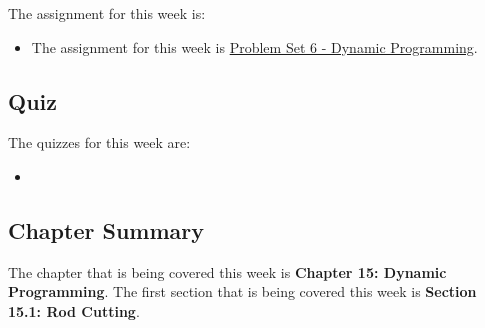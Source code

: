 The assignment for this week is:

\begin{itemize}
    \item The assignment for this week is \href{https://github.com/QuantumCompiler/CU/tree/main/CSPB%203104%20-%20Algorithms/CSPB%203104%20-%20Assignments/CSPB%203104%20-%20Problem%20Sets/CSPB%203104%20-%20Problem%20Set%206%20-%20Dynamic%20Programming}{Problem Set 6 - Dynamic Programming}. 
\end{itemize}

\subsection{Quiz}

The quizzes for this week are:

\begin{itemize}
    \item {} \textbullet {} 
\end{itemize}

\subsection{Chapter Summary}

The chapter that is being covered this week is \textbf{Chapter 15: Dynamic Programming}. The first section that is being covered this week is \textbf{Section 15.1: Rod Cutting}.

